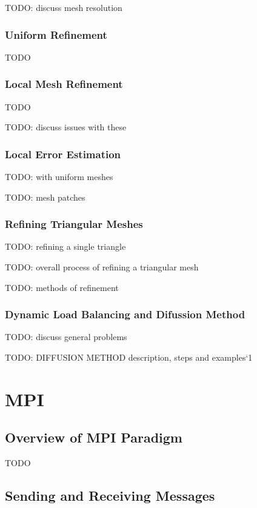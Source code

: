 \documentclass{article}
\begin{document}
TODO: discuss mesh resolution

\subsubsection{Uniform Refinement}

TODO

\subsubsection{Local Mesh Refinement}

TODO

TODO: discuss issues with these

\subsubsection{Local Error Estimation}

TODO: with uniform meshes

TODO: mesh patches

\subsubsection{Refining Triangular Meshes}

TODO: refining a single triangle

TODO: overall process of refining a triangular mesh

TODO: methods of refinement

\subsubsection{Dynamic Load Balancing and Difussion Method}

TODO: discuss general problems

TODO: DIFFUSION METHOD description, steps and examples`1

\section{MPI}

\subsection{Overview of MPI Paradigm}

TODO

\subsection{Sending and Receiving Messages}
\end{document}
